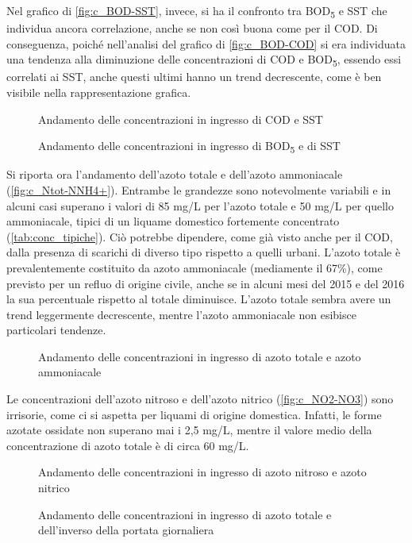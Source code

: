 Nel grafico di \autoref{fig:c_BOD-SST}, invece, si ha il confronto tra BOD\textsubscript{5} e SST che individua ancora correlazione, anche se non così buona come per il COD.
Di conseguenza, poiché nell’analisi del grafico di \autoref{fig:c_BOD-COD} si era individuata una tendenza alla diminuzione delle concentrazioni di COD e BOD\textsubscript{5}, essendo essi correlati ai SST, anche questi ultimi hanno un trend decrescente, come è ben visibile nella rappresentazione grafica.

\begin{figure}[H]
		\centering
	\caption{Andamento delle concentrazioni in ingresso di COD e SST}
	\label{fig:c_COD-SST}
\end{figure}
\begin{figure}[H]
		\centering
	\caption{Andamento delle concentrazioni in ingresso di BOD\textsubscript{5} e di SST}
	\label{fig:c_BOD-SST}
\end{figure}

Si riporta ora l’andamento dell’azoto totale e dell’azoto ammoniacale (\autoref{fig:c_Ntot-NNH4+}).
Entrambe le grandezze sono notevolmente variabili e in alcuni casi superano i valori di 85 mg/L per l’azoto totale e 50 mg/L per quello ammoniacale, tipici di un liquame domestico fortemente concentrato (\autoref{tab:conc_tipiche}). Ciò potrebbe dipendere, come già visto anche per il COD, dalla presenza di scarichi di diverso tipo rispetto a quelli urbani.
L’azoto totale è prevalentemente costituito da azoto ammoniacale (mediamente il 67\%), come previsto per un refluo di origine civile, anche se in alcuni mesi del 2015 e del 2016 la sua percentuale rispetto al totale diminuisce.
L’azoto totale sembra avere un trend leggermente decrescente, mentre l’azoto ammoniacale non esibisce particolari tendenze.
\begin{figure}[H]
		\centering
	\caption{Andamento delle concentrazioni in ingresso di azoto totale e azoto ammoniacale}
	\label{fig:c_Ntot-NNH4+}
\end{figure}
Le concentrazioni dell’azoto nitroso e dell’azoto nitrico (\autoref{fig:c_NO2-NO3}) sono irrisorie, come ci si aspetta per liquami di origine domestica. Infatti, le forme azotate ossidate non superano mai i 2,5 mg/L, mentre il valore medio della concentrazione di azoto totale è di circa 60 mg/L.
\begin{figure}[H]
	\fbox{\texttt{[image: c\_NO2-NO3]}}	\centering
	\caption{Andamento delle concentrazioni in ingresso di azoto nitroso e azoto nitrico}
	\label{fig:c_NO2-NO3}
\end{figure}
\begin{figure}[H]
		\centering
	\caption{Andamento delle concentrazioni in ingresso di azoto totale e dell'inverso della portata giornaliera}
	\label{fig:c_Ntot-1q}
\end{figure}

